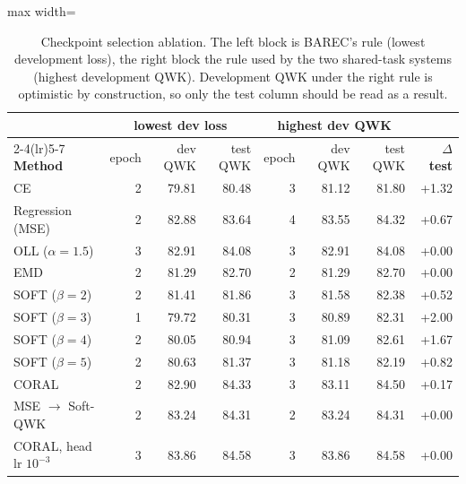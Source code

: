 \begin{table}[H]
\centering
\footnotesize
\caption{Checkpoint selection ablation. The left block is BAREC's rule (lowest development loss), the right block the rule used by the two shared-task systems (highest development QWK). Development QWK under the right rule is optimistic by construction, so only the test column should be read as a result.}
\label{tab:res-selection}
\begin{adjustbox}{max width=\textwidth}
\begin{tabular}{lrrrrrrr}
\toprule
& \multicolumn{3}{c}{\textbf{lowest dev loss}} & \multicolumn{3}{c}{\textbf{highest dev QWK}} & \\
\cmidrule(lr){2-4}\cmidrule(lr){5-7}
\textbf{Method} & epoch & dev QWK & test QWK & epoch & dev QWK & test QWK & \textbf{$\Delta$ test} \\
\midrule
CE & 2 & 79.81 & 80.48 & 3 & 81.12 & 81.80 & +1.32 \\
Regression (MSE) & 2 & 82.88 & 83.64 & 4 & 83.55 & 84.32 & +0.67 \\
OLL ($\alpha=1.5$) & 3 & 82.91 & 84.08 & 3 & 82.91 & 84.08 & +0.00 \\
EMD & 2 & 81.29 & 82.70 & 2 & 81.29 & 82.70 & +0.00 \\
SOFT ($\beta=2$) & 2 & 81.41 & 81.86 & 3 & 81.58 & 82.38 & +0.52 \\
SOFT ($\beta=3$) & 1 & 79.72 & 80.31 & 3 & 80.89 & 82.31 & +2.00 \\
SOFT ($\beta=4$) & 2 & 80.05 & 80.94 & 3 & 81.09 & 82.61 & +1.67 \\
SOFT ($\beta=5$) & 2 & 80.63 & 81.37 & 3 & 81.18 & 82.19 & +0.82 \\
CORAL & 2 & 82.90 & 84.33 & 3 & 83.11 & 84.50 & +0.17 \\
MSE $\rightarrow$ Soft-QWK & 2 & 83.24 & 84.31 & 2 & 83.24 & 84.31 & +0.00 \\
CORAL, head lr $10^{-3}$ & 3 & 83.86 & 84.58 & 3 & 83.86 & 84.58 & +0.00 \\
\bottomrule
\end{tabular}
\end{adjustbox}
\end{table}
